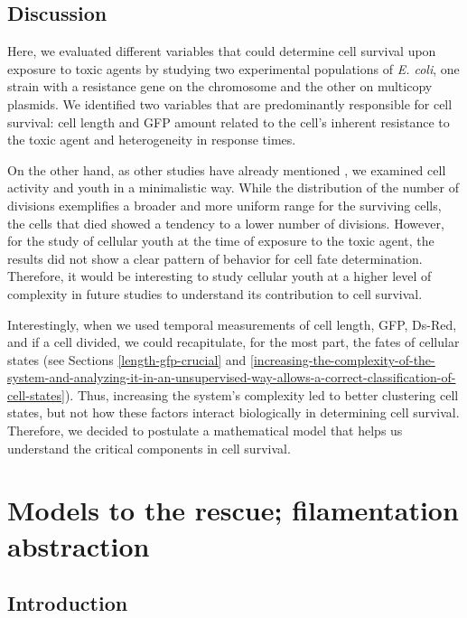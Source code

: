 \documentclass[
  12pt,
  a4paper,
  oneside]{krantz}
\begin{document}
\hypertarget{discussion}{%
\section{Discussion}\label{discussion}}

Here, we evaluated different variables that could determine cell
survival upon exposure to toxic agents by studying two experimental
populations of \emph{E. coli}, one strain with a resistance gene on the
chromosome and the other on multicopy plasmids. We identified two
variables that are predominantly responsible for cell survival: cell
length and GFP amount related to the cell's inherent resistance to the
toxic agent and heterogeneity in response times.

On the other hand, as other studies have already mentioned
\citep{heinrich2015, wang2009}, we examined cell activity and youth in a
minimalistic way. While the distribution of the number of divisions
exemplifies a broader and more uniform range for the surviving cells,
the cells that died showed a tendency to a lower number of divisions.
However, for the study of cellular youth at the time of exposure to the
toxic agent, the results did not show a clear pattern of behavior for
cell fate determination. Therefore, it would be interesting to study
cellular youth at a higher level of complexity in future studies to
understand its contribution to cell survival.

Interestingly, when we used temporal measurements of cell length, GFP,
Ds-Red, and if a cell divided, we could recapitulate, for the most part,
the fates of cellular states (see Sections \ref{length-gfp-crucial} and
\ref{increasing-the-complexity-of-the-system-and-analyzing-it-in-an-unsupervised-way-allows-a-correct-classification-of-cell-states}).
Thus, increasing the system's complexity led to better clustering cell
states, but not how these factors interact biologically in determining
cell survival. Therefore, we decided to postulate a mathematical model
that helps us understand the critical components in cell survival.

\hypertarget{model-analysis}{%
\chapter{Models to the rescue; filamentation abstraction}\label{model-analysis}}

\hypertarget{introduction-3}{%
\section{Introduction}\label{introduction-3}}
\end{document}
